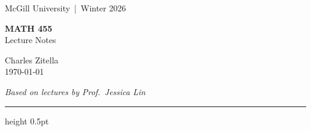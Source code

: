 \documentclass[11pt]{report}
\begin{document}
\thispagestyle{empty}

\vspace*{1cm}

\begin{center}
{\small\sffamily\color{gray} McGill University \,|\, Winter 2026}

\vspace{0.8cm}

{\Huge\bfseries\sffamily\color{MidnightBlue} MATH 455}\\[0.4cm]
{\LARGE\sffamily Lecture Notes}

\vspace{1.2cm}

{\large Charles Zitella}\\[0.3cm]
{\small\color{gray} \today}

\vspace{0.8cm}

{\small\itshape Based on lectures by Prof.\ Jessica Lin}
\end{center}

\vspace{1.0cm}

\vspace{0.3cm}

\noindent\hrule height 0.5pt
\vspace{0.3cm}

{\small\makeatletter{}\makeatother\par}

\restoregeometry





\newpage

\pagestyle{plain}

\printindex
\end{document}
